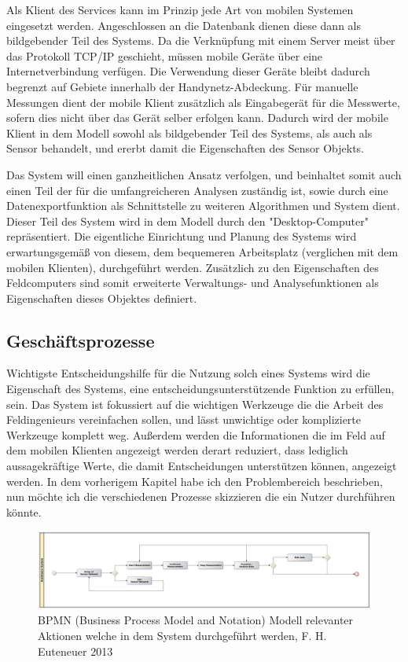 Als Klient des Services kann im Prinzip jede Art von mobilen Systemen eingesetzt werden. Angeschlossen an die Datenbank dienen diese dann als bildgebender Teil des Systems. Da die Verknüpfung mit einem \gls{Server} meist über das Protokoll  \gls{TCP/IP} geschieht, müssen mobile Geräte über eine Internetverbindung verfügen. Die Verwendung dieser Geräte bleibt dadurch begrenzt auf Gebiete innerhalb der Handynetz-Abdeckung. Für manuelle Messungen dient der mobile Klient zusätzlich als Eingabegerät für die Messwerte, sofern dies nicht über das Gerät selber erfolgen kann. Dadurch wird der mobile Klient in dem Modell sowohl als bildgebender Teil des Systems, als auch als Sensor behandelt, und ererbt damit die Eigenschaften des Sensor Objekts.

Das System will einen ganzheitlichen Ansatz verfolgen, und beinhaltet somit auch einen Teil der für die umfangreicheren Analysen zuständig ist, sowie durch eine Datenexportfunktion als Schnittstelle zu weiteren Algorithmen und System dient. Dieser Teil des System wird in dem Modell durch den "Desktop-Computer" repräsentiert. Die eigentliche Einrichtung und Planung des Systems wird erwartungsgemäß von diesem, dem bequemeren Arbeitsplatz (verglichen mit dem mobilen Klienten), durchgeführt werden. Zusätzlich zu den Eigenschaften des Feldcomputers sind somit erweiterte Verwaltungs- und Analysefunktionen als Eigenschaften dieses Objektes definiert.


\subsection{Geschäftsprozesse}
Wichtigste Entscheidungshilfe für die Nutzung solch eines Systems wird die Eigenschaft des Systems, eine entscheidungsunterstützende Funktion zu erfüllen, sein. Das System ist fokussiert auf die wichtigen Werkzeuge die die Arbeit des Feldingenieurs vereinfachen sollen, und lässt unwichtige oder komplizierte Werkzeuge komplett weg. Außerdem werden die Informationen die im Feld auf dem mobilen Klienten angezeigt werden derart reduziert, dass lediglich aussagekräftige Werte, die damit Entscheidungen unterstützen können, angezeigt werden. In dem vorherigem Kapitel habe ich den Problembereich beschrieben, nun möchte ich die verschiedenen Prozesse skizzieren die ein Nutzer durchführen könnte.

\begin{figure}[H]
	\centering
 	 \includegraphics[scale=0.2]{graphics/bpmn_business-processes.jpg} 
	\caption{BPMN (Business Process Model and Notation) Modell relevanter Aktionen welche in dem System durchgeführt werden, F. H. Euteneuer 2013}
	 \label{fig:model_business-processes}
\end{figure}

